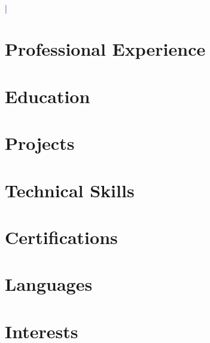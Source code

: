 \documentclass[11pt]{article}
\begin{document}
\begin{center}
    {\huge \textbf{\textcolor{darkblue}{}}} \\
    \vspace{5pt}
    \textcolor{darkblue}{ | } \\
\end{center}

\vspace{10pt}

\section*{Professional Experience}

\section*{Education}

\section*{Projects}

\section*{Technical Skills}

\section*{Certifications}

\section*{Languages}

\section*{Interests}
\end{document}
